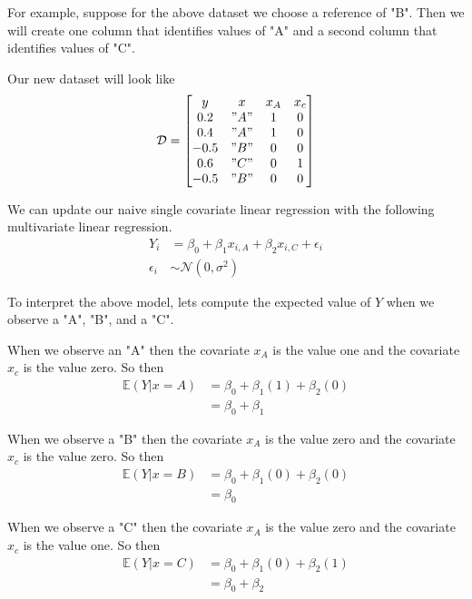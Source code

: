 For example, suppose for the above dataset we choose a reference of "B". 
Then we will create one column that identifies values of "A" and a second column that identifies values of "C". 

Our new dataset will look like 
\begin{align}
\mathcal{D} = \begin{bmatrix}
        y & x & x_{A} & x_{c}\\
        0.2  & "A" & 1 & 0\\
        0.4  & "A" & 1 & 0\\
        -0.5 & "B" & 0 & 0\\
        0.6  & "C" & 0 & 1\\
        -0.5 & "B" & 0 & 0\\
              \end{bmatrix}
\end{align}

We can update our naive single covariate linear regression with the following multivariate linear regression. 
\begin{align}
    Y_{i} &= \beta_{0} + \beta_{1}x_{i,A} + \beta_{2}x_{i,C} + \epsilon_{i}\\
    \epsilon_{i} & \sim \mathcal{N}(0,\sigma^{2}) 
\end{align}

To interpret the above model, lets compute the expected value of $Y$ when we observe a "A", "B", and a "C". 

When we observe an "A" then the covariate $x_{A}$ is the value one and the covariate $x_{c}$ is the value zero. So then 
\begin{align}
    \mathbb{E}(Y |x=A) &= \beta_{0} + \beta_{1} (1) + \beta_{2} (0)\\
                       &= \beta_{0} + \beta_{1}
\end{align}

When we observe a "B" then the covariate $x_{A}$ is the value zero and the covariate $x_{c}$ is the value zero. So then 
\begin{align}
    \mathbb{E}(Y |x=B) &= \beta_{0} + \beta_{1} (0) + \beta_{2} (0)\\
                       &= \beta_{0}
\end{align}

When we observe a "C" then the covariate $x_{A}$ is the value zero and the covariate $x_{c}$ is the value one. So then 
\begin{align}
    \mathbb{E}(Y |x=C) &= \beta_{0} + \beta_{1} (0) + \beta_{2} (1)\\
                       &= \beta_{0} + \beta_{2}
\end{align}

